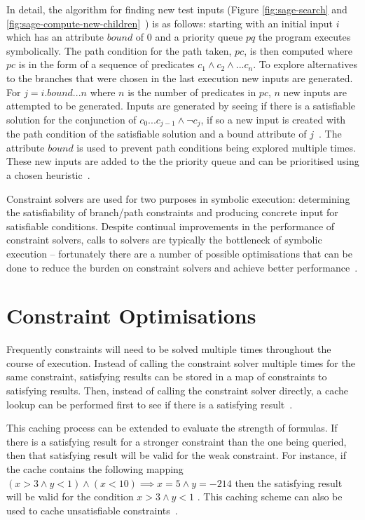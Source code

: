 \documentclass[]{final_report}
\begin{document}
In detail, the algorithm for finding new test inputs (Figure \ref{fig:sage-search} and \ref{fig:sage-compute-new-children}~\cite{godefroid2008automated}) is as follows: starting with an initial input $i$ which has an attribute $bound$ of 0 and a priority queue $pq$ the program executes symbolically. The path condition for the path taken, $pc$, is then computed where $pc$ is in the form of a sequence of predicates $c_1 \land c_2 \land ... c_n $. To explore alternatives to the branches that were chosen in the last execution new inputs are generated.  For $j = i.bound ... n$ where $n$ is the number of predicates in $pc$, $n$ new inputs are attempted to be generated. Inputs are generated by seeing if there is a satisfiable solution for the conjunction of $c_0...c_{j-1} \land \lnot{c_j}$, if so a new input is created with the path condition of the satisfiable solution and a bound attribute of $j$~\cite{godefroid2005dart, godefroid2008grammar}. The attribute $bound$ is used to prevent path conditions being explored multiple times. These new inputs are added to the the priority queue and can be prioritised using a chosen heuristic~\cite{cadar2013symbolic}.

Constraint solvers are used for two purposes in symbolic execution: determining the satisfiability of branch/path constraints and producing concrete input for satisfiable conditions. Despite continual improvements in the performance of constraint solvers, calls to solvers are typically the bottleneck of symbolic execution -- fortunately there are a number of possible optimisations that can be done to reduce the burden on constraint solvers and achieve better performance~\cite{cadar2013symbolic}.

\section{Constraint Optimisations}
Frequently constraints will need to be solved multiple times throughout the course of execution. Instead of calling the constraint solver multiple times for the same constraint, satisfying results can be stored in a map of constraints to satisfying results. Then, instead of calling the constraint solver directly, a cache lookup can be performed first to see if there is a satisfying result~\cite{cadar2008klee}.

This caching process can be extended to evaluate the strength of formulas. If there is a satisfying result for a stronger constraint than the one being queried, then that satisfying result will be valid for the weak constraint. For instance, if the cache contains the following mapping $ (x > 3 \land y <1) \land (x < 10) \implies x = 5 \land y = -214$ then the satisfying result will be valid for the condition $x > 3 \land y < 1 $ . This caching scheme can also be used to cache unsatisfiable constraints~\cite{cadar2008klee}.
\end{document}
